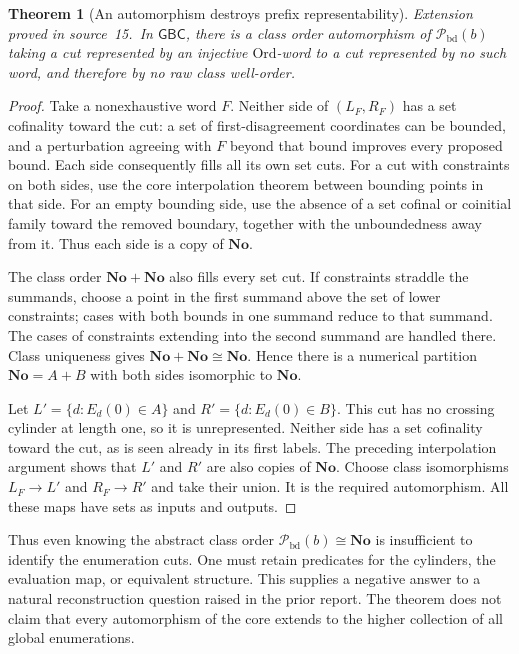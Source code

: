 \documentclass[11pt]{article}
\newtheorem{theorem}{Theorem}[section]
\theoremstyle{definition}
\theoremstyle{remark}
\newcommand{\No}{\mathbf{No}}
\newcommand{\Ord}{\mathrm{Ord}}
\newcommand{\Pbd}{\mathcal P_{\mathrm{bd}}}
\newcommand{\GBC}{\mathsf{GBC}}
\begin{document}
\begin{theorem}[An automorphism destroys prefix representability]\label{swo:cb:thm:automorphism}
\textit{Extension proved in source~15.}\ In $\GBC$, there is a class order automorphism of $\Pbd(b)$ taking a
cut represented by an injective $\Ord$-word to a cut represented by
no such word, and therefore by no raw class well-order.
\end{theorem}
\begin{proof}
Take a nonexhaustive word $F$. Neither side of $(L_F,R_F)$ has a set
cofinality toward the cut: a set of first-disagreement coordinates can
be bounded, and a perturbation agreeing with $F$ beyond that bound
improves every proposed bound. Each side consequently fills all its
own set cuts. For a cut with constraints on both sides, use the core
interpolation theorem between bounding points in that side. For an
empty bounding side, use the absence of a set cofinal or coinitial
family toward the removed boundary, together with the unboundedness
away from it. Thus each side is a copy of $\No$.

The class order $\No+\No$ also fills every set cut. If constraints
straddle the summands, choose a point in the first summand above the
set of lower constraints; cases with both bounds in one summand reduce
to that summand. The cases of constraints extending into the second
summand are handled there. Class uniqueness gives $\No+\No\cong\No$.
Hence there is a numerical partition $\No=A+B$ with both sides
isomorphic to $\No$.

Let $L'=\{d:E_d(0)\in A\}$ and $R'=\{d:E_d(0)\in B\}$.
This cut has no crossing cylinder at length one, so it is unrepresented.
Neither side has a set cofinality toward the cut, as is seen already
in its first labels. The preceding interpolation argument shows that
$L'$ and $R'$ are also copies of $\No$. Choose class isomorphisms
$L_F\to L'$ and $R_F\to R'$ and take their union. It is the required
automorphism. All these maps have sets as inputs and outputs.
\end{proof}

Thus even knowing the abstract class order $\Pbd(b)\cong\No$ is insufficient
to identify the enumeration cuts. One must retain predicates for the
cylinders, the evaluation map, or equivalent structure. This supplies
a negative answer to a natural reconstruction question raised in the
prior report. The theorem does not claim that every automorphism of the
core extends to the higher collection of all global enumerations.
\end{document}
